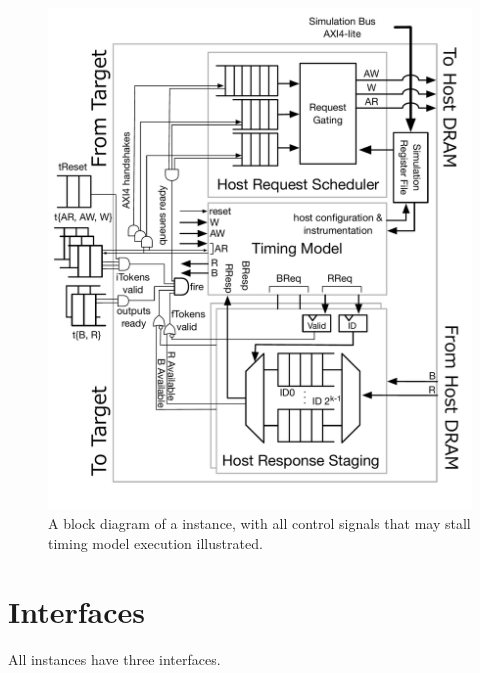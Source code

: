 \begin{figure}
	\centering
	\includegraphics[width=\columnwidth]{figures/memory-model-block-diagram.pdf}
    \caption{A block diagram of a \PNAME instance, with all control signals
    that may stall timing model execution illustrated.}
	\label{fig:timing-model}
\end{figure}

\section{Interfaces}\label{sec:interfaces}

All instances have three interfaces.

